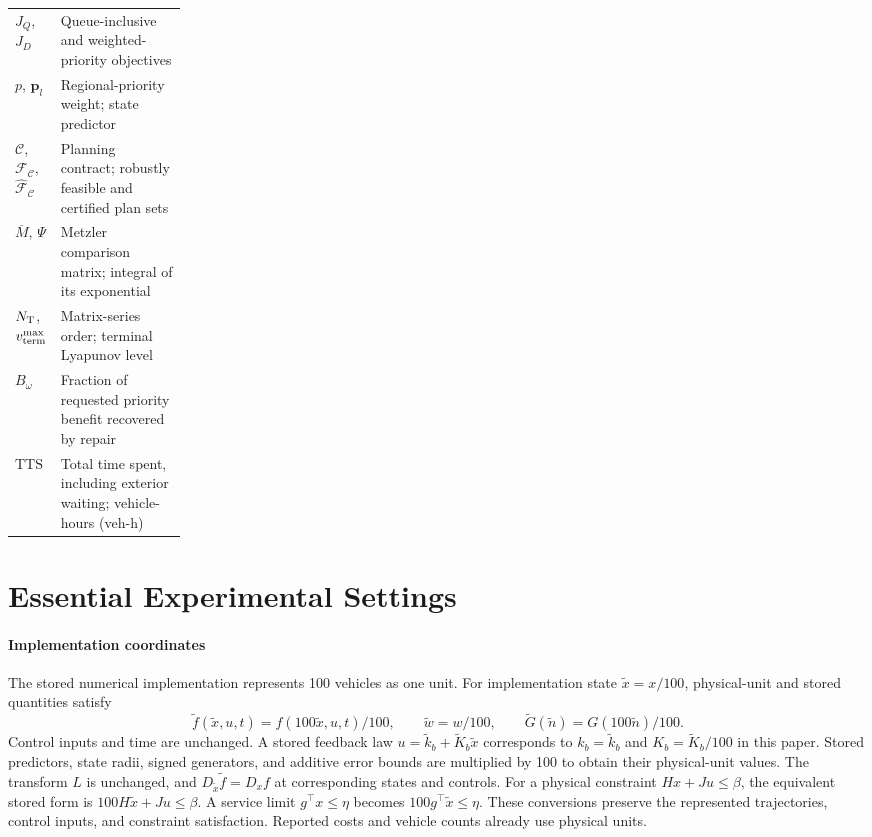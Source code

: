 \documentclass[preprint,12pt]{elsarticle}
\theoremstyle{definition}
\theoremstyle{plain}
\theoremstyle{definition}
\theoremstyle{plain}
\begin{document}
\begin{longtable}{@{}p{0.20\linewidth}>{\raggedright\arraybackslash}p{}@{}}
$J_Q$, $J_D$ & Queue-inclusive and weighted-priority objectives\\
$p$, $\mathbf p_l$ & Regional-priority weight; state predictor\\
$\mathcal C$, $\mathcal F_{\mathcal C}$, $\widehat{\mathcal F}_{\mathcal C}$ & Planning contract; robustly feasible and certified plan sets\\
$\overline M$, $\Psi$ & Metzler comparison matrix; integral of its exponential\\
$N_{\rm T}$, $v_{\rm term}^{\max}$ & Matrix-series order; terminal Lyapunov level\\
$B_\omega$ & Fraction of requested priority benefit recovered by repair\\
$\mathrm{TTS}$ & Total time spent, including exterior waiting; vehicle-hours (veh-h)\\
\end{longtable}
\endgroup

\section{Essential Experimental Settings}
\label{app:experimental-settings}
\label{app:reusable-benchmark}
\label{sec:supp-queue-settings}
\label{app:benchmark-details}

\paragraph{Implementation coordinates}
The stored numerical implementation represents 100 vehicles as one unit.
For implementation state $\widetilde x=x/100$, physical-unit and stored
quantities satisfy
\[
\widetilde f(\widetilde x,u,t)=f(100\widetilde x,u,t)/100,\qquad
\widetilde w=w/100,\qquad
\widetilde G(\widetilde n)=G(100\widetilde n)/100.
\]
Control inputs and time are unchanged. A stored feedback law
$u=\widetilde k_b+\widetilde K_b\widetilde x$ corresponds to
$k_b=\widetilde k_b$ and $K_b=\widetilde K_b/100$ in this paper.
Stored predictors, state radii, signed generators, and additive error
bounds are multiplied by 100 to obtain their physical-unit values.
The transform $L$ is unchanged, and
$D_{\widetilde x}\widetilde f=D_x f$ at corresponding states and controls.
For a physical constraint $Hx+Ju\le\beta$, the equivalent stored form is
$100H\widetilde x+Ju\le\beta$.
A service limit $g^\top x\le\eta$ becomes
$100g^\top\widetilde x\le\eta$.
These conversions preserve the represented trajectories, control inputs,
and constraint satisfaction. Reported costs and vehicle counts already
use physical units.
\end{document}
